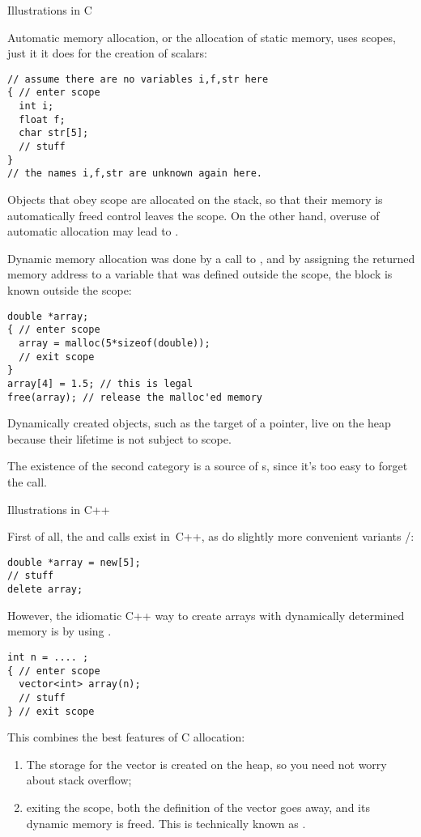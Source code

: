  {Illustrations in C}

Automatic memory allocation, or the allocation of static memory,
uses scopes, just it it does for the creation of scalars:
\begin{lstlisting}
// assume there are no variables i,f,str here
{ // enter scope
  int i;
  float f;
  char str[5];
  // stuff
}
// the names i,f,str are unknown again here.
\end{lstlisting}
Objects that obey scope are allocated on the stack, so that
their memory is automatically freed control leaves the scope.
On the other hand, overuse of automatic allocation
may lead to .

Dynamic memory allocation was done by a call to ,
and by assigning the returned memory address to a variable
that was defined outside the scope, the block is known outside the scope:
\begin{lstlisting}
double *array;
{ // enter scope
  array = malloc(5*sizeof(double));
  // exit scope
}
array[4] = 1.5; // this is legal
free(array); // release the malloc'ed memory
\end{lstlisting}
Dynamically created objects, such as the target of a pointer,
live on the heap because their lifetime is not subject to scope.

The existence of the second category is a source of
s, since it's too easy to forget the  call.

 {Illustrations in C++}

First of all, the  and  calls exist in~C++,
as do slightly more convenient variants /:
\begin{lstlisting}
double *array = new[5];
// stuff
delete array;
\end{lstlisting}

However, the idiomatic C++ way to create arrays with dynamically determined memory
is by using .
\begin{lstlisting}
int n = .... ;
{ // enter scope
  vector<int> array(n);
  // stuff
} // exit scope
\end{lstlisting}
This combines the best features of C allocation:
\begin{enumerate}
\item The storage for the vector is created on the heap,
  so you need not worry about stack overflow;
\item exiting the scope, both the definition of the vector goes away,
  and its dynamic memory is freed.
  This is technically known as .
\end{enumerate}

